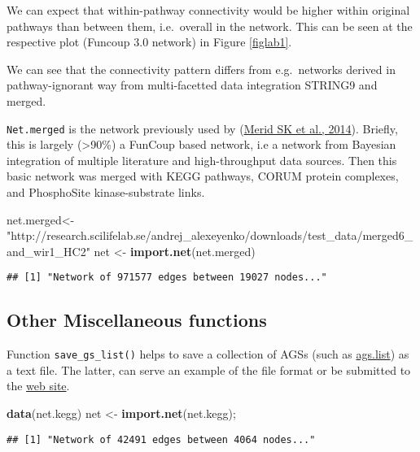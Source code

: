 \documentclass[]{article}
\newenvironment{Shaded}{\begin{snugshade}}{\end{snugshade}}
\newcommand{\KeywordTok}[1]{\textcolor[rgb]{0.13,0.29,0.53}{\textbf{#1}}}
\newcommand{\StringTok}[1]{\textcolor[rgb]{0.31,0.60,0.02}{#1}}
\newcommand{\NormalTok}[1]{#1}
\begin{document}
We can expect that within-pathway connectivity would be higher within
original pathways than between them, i.e.~overall in the network. This
can be seen at the respective plot (Funcoup 3.0 network) in Figure
\ref{figlab1}.

We can see that the connectivity pattern differs from e.g.~networks
derived in pathway-ignorant way from multi-facetted data integration
STRING9 and merged.

\texttt{Net.merged} is the network previously used by
(\href{http://bmcbioinformatics.biomedcentral.com/articles/10.1186/1471-2105-15-308}{Merid
SK et al., 2014}). Briefly, this is largely (\textgreater{}90\%) a
FunCoup based network, i.e a network from Bayesian integration of
multiple literature and high-throughput data sources. Then this basic
network was merged with KEGG pathways, CORUM protein complexes, and
PhosphoSite kinase-substrate links.

\begin{Shaded}
\begin{Highlighting}[]
\NormalTok{net.merged<-}\StringTok{"http://research.scilifelab.se/andrej_alexeyenko/downloads/test_data/merged6_and_wir1_HC2"}
\NormalTok{net <-}\StringTok{ }\KeywordTok{import.net}\NormalTok{(net.merged)}
\end{Highlighting}
\end{Shaded}

\begin{verbatim}
## [1] "Network of 971577 edges between 19027 nodes..."
\end{verbatim}

\hypertarget{misc}{\subsection{Other Miscellaneous
functions}\label{misc}}

Function \texttt{save\_gs\_list()} helps to save a collection of AGSs
(such as \protect\hyperlink{ags}{ags.list}) as a text file. The latter,
can serve an example of the file format or be submitted to the
\href{https://www.evinet.org}{web site}.

\begin{Shaded}
\begin{Highlighting}[]
\KeywordTok{data}\NormalTok{(net.kegg)}
\NormalTok{net <-}\StringTok{ }\KeywordTok{import.net}\NormalTok{(net.kegg);}
\end{Highlighting}
\end{Shaded}

\begin{verbatim}
## [1] "Network of 42491 edges between 4064 nodes..."
\end{verbatim}
\end{document}
